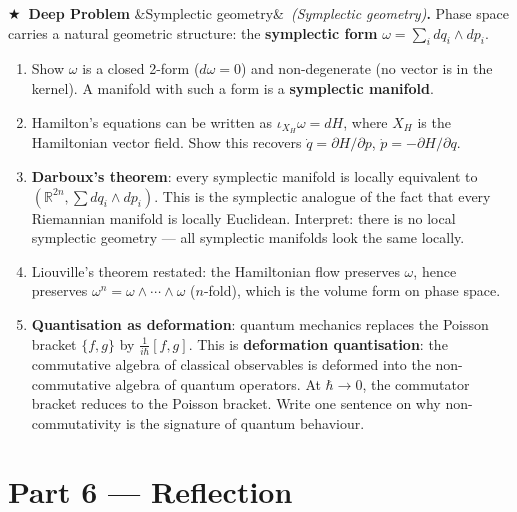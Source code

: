\documentclass[12pt,a4paper]{article}
\newcounter{problem}
\newcounter{deepproblem}
\newenvironment{deepproblem}[1][]{\refstepcounter{deepproblem}\par\vspace{6pt}\noindent\textbf{\color{NavyBlue}$\bigstar$\ Deep Problem \thedeepproblem}\ifx&#1&\else\ \textit{(#1)}\fi\textbf{.}\enskip}{\par\vspace{4pt}}
\begin{document}
\begin{deepproblem}[Symplectic geometry]
Phase space carries a natural geometric structure: the \textbf{symplectic form} $\omega = \sum_i dq_i\wedge dp_i$.
\begin{enumerate}[label=(\alph*)]
  \item Show $\omega$ is a closed 2-form ($d\omega=0$) and non-degenerate (no vector is in the kernel). A manifold with such a form is a \textbf{symplectic manifold}.
  \item Hamilton's equations can be written as $\iota_{X_H}\omega = dH$, where $X_H$ is the Hamiltonian vector field. Show this recovers $\dot q=\partial H/\partial p$, $\dot p=-\partial H/\partial q$.
  \item \textbf{Darboux's theorem}: every symplectic manifold is locally equivalent to $(\mathbb{R}^{2n},\sum dq_i\wedge dp_i)$. This is the symplectic analogue of the fact that every Riemannian manifold is locally Euclidean. Interpret: there is no local symplectic geometry --- all symplectic manifolds look the same locally.
  \item Liouville's theorem restated: the Hamiltonian flow preserves $\omega$, hence preserves $\omega^n = \omega\wedge\cdots\wedge\omega$ ($n$-fold), which is the volume form on phase space.
  \item \textbf{Quantisation as deformation}: quantum mechanics replaces the Poisson bracket $\{f,g\}$ by $\frac{1}{i\hbar}[f,g]$. This is \textbf{deformation quantisation}: the commutative algebra of classical observables is deformed into the non-commutative algebra of quantum operators. At $\hbar\to 0$, the commutator bracket reduces to the Poisson bracket. Write one sentence on why non-commutativity is the signature of quantum behaviour.
\end{enumerate}
\end{deepproblem}

\section{Part 6 \texorpdfstring{---}{--} Reflection}
\end{document}
